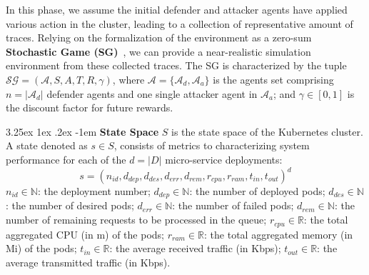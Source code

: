 \documentclass[conference]{IEEEtran}
\makeatletter
\renewcommand\paragraph{\@startsection{paragraph}{5}{\z@}%
  {3.25ex \@plus1ex \@minus.2ex}%
  {-1em}%
  {\normalfont\normalsize\bfseries}}
\makeatother
\begin{document}
In this phase, we assume the initial defender and attacker agents have applied various action in the cluster, leading to a collection of representative amount of traces. Relying on the formalization of the environment as a zero-sum \textbf{Stochastic Game (SG)}~\cite{shapley1953stochastic}, we can provide a near-realistic simulation environment from these collected traces. The SG is characterized by the tuple $\mathcal{SG} = (\mathcal{A}, S, A, T, R, \gamma)$, where $\mathcal{A} = \{\mathcal{A}_d, \mathcal{A}_a\}$ is the agents set comprising $n = |\mathcal{A}_d|$ defender agents and one single attacker agent in $\mathcal{A}_a$; and $\gamma \in [0, 1]$ is the discount factor for future rewards.

\noindent \paragraph{\textbf{State Space}} $S$ is the state space of the Kubernetes cluster. A state denoted as $s \in S$, consists of metrics to characterizing system performance for each of the $d = |D|$ micro-service deployments:
$$
s = (n_{id}, d_{dep}, d_{des}, d_{err}, d_{rem}, r_{cpu}, r_{ram}, t_{in}, t_{out})^d
$$
$n_{id} \in \mathbb{N}$: the deployment number; \quad
$d_{dep} \in \mathbb{N}$: the number of deployed pods; \quad 
$d_{des} \in \mathbb{N}$: the number of desired pods; \quad
$d_{err} \in \mathbb{N}$: the number of failed pods; \quad
$d_{rem} \in \mathbb{N}$: the number of remaining requests to be processed in the queue; \quad
$r_{cpu} \in \mathbb{R}$: the total aggregated CPU (in m) of the pods; \quad
$r_{ram} \in \mathbb{R}$: the total aggregated memory (in Mi) of the pods; \quad
$t_{in} \in \mathbb{R}$: the average received traffic (in Kbps); \quad
$t_{out} \in \mathbb{R}$: the average transmitted traffic (in Kbps).

\end{document}
